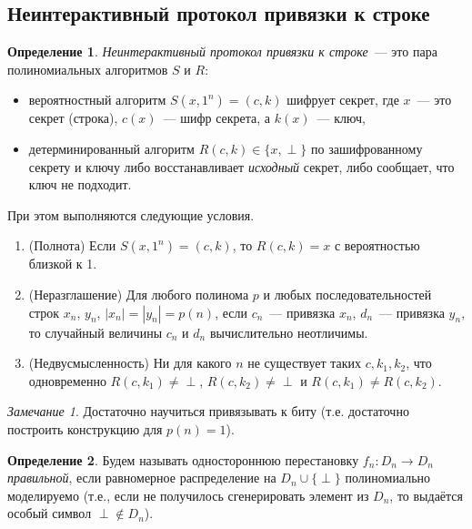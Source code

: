 \documentclass[12pt,a4paper]{article}
\theoremstyle{definition}
\newtheorem{definition}{Определение}[section]
\theoremstyle{plain}
\theoremstyle{remark}
\newtheorem{remark}{Замечание}[section]
\begin{document}
\subsection{Неинтерактивный протокол привязки к строке}
\begin{definition}
\emph{Неинтерактивный протокол привязки к строке}~--- это пара полиномиальных алгоритмов $S$ и $R$:
\begin{itemize}
\item вероятностный алгоритм $S(x, 1^n) = (c, k)$ шифрует секрет, где $x$~--- это секрет (строка), 
$c(x)$~--- шифр секрета, а $k(x)$~--- ключ,
\item детерминированный алгоритм $R(c, k) \in \{x,\perp\}$ по зашифрованному секрету и ключу либо восстанавливает 
\emph{исходный} секрет, либо сообщает, что ключ не подходит.
\end{itemize}
При этом выполняются следующие условия.
\begin{enumerate}
\item (Полнота) Если $S(x, 1^n) = (c, k)$, то $R(c, k) = x$ с вероятностью близкой к 1.
\item (Неразглашение) Для любого полинома $p$ и любых последовательностей строк $x_n$, $y_n$,
$|x_n|=|y_n|=p(n)$, если $c_n$~--- привязка $x_n$, $d_n$~--- привязка $y_n$,
то случайный величины $c_n$ и $d_n$ вычислительно неотличимы.
\item (Недвусмысленность) Ни для какого $n$ не существует таких $c, k_1, k_2$, что одновременно $R(c, k_1)\neq \perp$, $R(c, k_2)\neq \perp$
и $R(c, k_1)\neq R(c, k_2)$.
\end{enumerate}
\end{definition}

\begin{remark}
Достаточно научиться привязывать к биту (т.е. достаточно построить конструкцию для $p(n) = 1$).
\end{remark}

\begin{definition}
Будем называть одностороннюю перестановку $f_n : D_n\to D_n$ \emph{правильной},
если равномерное распределение на $D_n\cup \{\perp\}$ полиномиально моделируемо (т.е., если не
получилось сгенерировать элемент из $D_n$, то выдаётся особый символ $\perp\not\in D_n$).
\end{definition}
\end{document}
